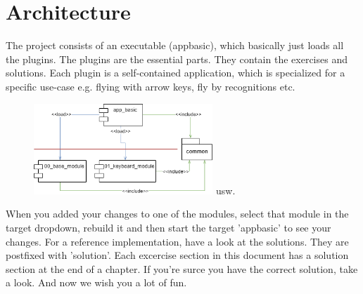 \section{Architecture}
The project consists of an executable (app\textunderscore basic), which basically just loads all the plugins.
The plugins are the essential parts. They contain the exercises and solutions. Each plugin is a self-contained application,
which is specialized for a specific use-case e.g. flying with arrow keys, fly by recognitions etc.
\begin{figure}[H]
    \centering
    \includegraphics[width=0.6\textwidth]{./chapter_01/resources/01_architecture.png}
    usw.
\end{figure}
When you added your changes to one of the modules, select that module in the target dropdown, rebuild it and then
start the target 'app\textunderscore basic' to see your changes. For a reference implementation, have a look at the solutions.
They are postfixed with '\textunderscore solution'. Each excercise section in this document has a solution section at
the end of a chapter. If you're surce you have the correct solution, take a look.\newline
And now we wish you a lot of fun.